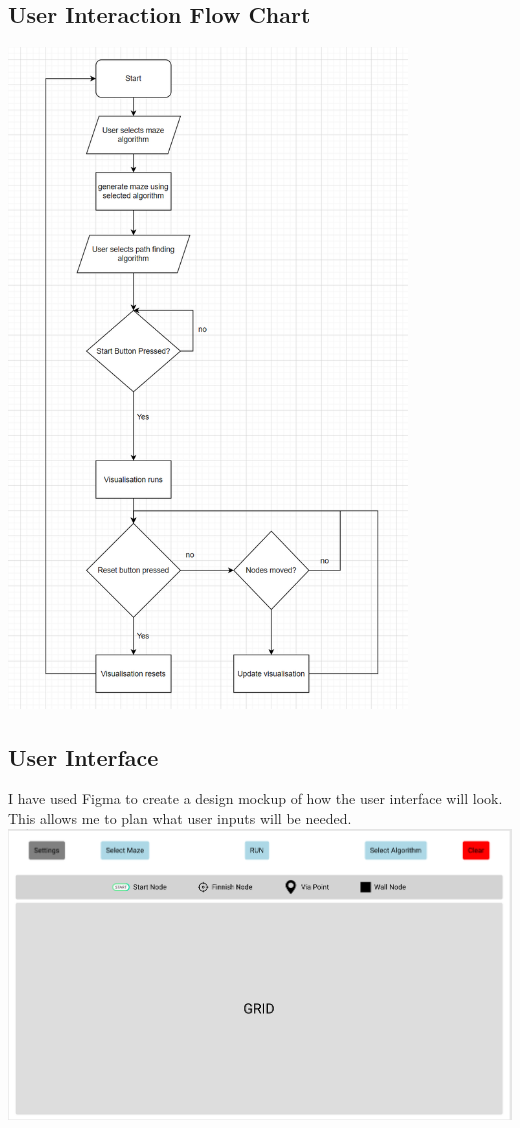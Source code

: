 \documentclass[titlepage]{article}
\begin{document}
\subsection{User Interaction Flow Chart}
\includegraphics[width=\linewidth, height=17.5cm]{assets/flow chart.PNG}

\subsection{User Interface}
I have used Figma to create a design mockup of how the user interface will look. This allows me to plan what user inputs will be needed.
\newline
\includegraphics[width=\linewidth]{assets/gui.PNG}
\end{document}
